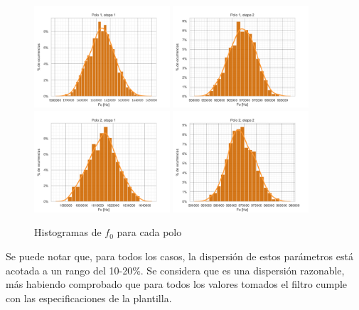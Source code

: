 \begin{figure}[H]
    \centering
    \includegraphics[width=0.45\textwidth]{../Ex3/Resources/histograma_w0_poles_00.png}
    \includegraphics[width=0.45\textwidth]{../Ex3/Resources/histograma_w0_poles_01.png}
    \includegraphics[width=0.45\textwidth]{../Ex3/Resources/histograma_w0_poles_10.png}
    \includegraphics[width=0.45\textwidth]{../Ex3/Resources/histograma_w0_poles_11.png}
    \caption{Histogramas de $f_{0}$ para cada polo}
    \label{sedrahistf0}
\end{figure}
Se puede notar que, para todos los casos, la dispersión de estos parámetros está acotada a un rango del 10-20\%. Se considera que es una dispersión razonable, más habiendo comprobado que para todos los valores tomados el filtro cumple con las especificaciones de la plantilla.

